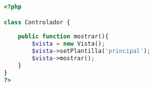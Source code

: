 \begin{lstlisting}[label=mvc_controlador,caption=Clase Controlador,language=PHP]
<?php

class Controlador {
	
	public function mostrar(){
		$vista = new Vista();
		$vista->setPlantilla('principal');
		$vista->mostrar();
	}
}
?>
\end{lstlisting}
